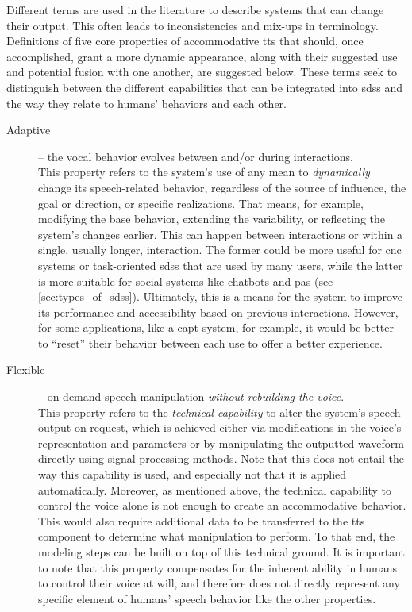 Different terms are used in the literature to describe systems that can change their output.
This often leads to inconsistencies and mix-ups in terminology.
Definitions of five core properties of accommodative \ac{tts} that should, once accomplished, grant a more dynamic appearance, along with their suggested use and potential fusion with one another, are suggested below.
These terms seek to distinguish between the different capabilities that can be integrated into \acp{sds} and the way they relate to humans’ behaviors and each other.
%
\begin{description}
	\item[Adaptive] -- the vocal behavior evolves between and/or during interactions.\\
	This property refers to the system's use of any mean to \emph{dynamically} change its speech-related behavior, regardless of the source of influence, the goal or direction, or specific realizations.
	That means, for example, modifying the base behavior, extending the variability, or reflecting the system's changes earlier.
	This can happen between interactions or within a single, usually longer, interaction.
	The former could be more useful for \ac{cnc} systems or task-oriented \acp{sds} that are used by many users, while the latter is more suitable for social systems like chatbots and \acp{pa} (see \cref{sec:types_of_sdss}).
	Ultimately, this is a means for the system to improve its performance and accessibility based on previous interactions.
	However, for some applications, like a \ac{capt} system, for example, it would be better to \enquote{reset} their behavior between each use to offer a better experience.

	\item[Flexible] -- on-demand speech manipulation \emph{without rebuilding the voice}.\\
	This property refers to the \emph{technical capability} to alter the system's speech output on request, which is achieved either via modifications in the voice's representation and parameters or by manipulating the outputted waveform directly using signal processing methods.
	Note that this does not entail the way this capability is used, and especially not that it is applied automatically.
	Moreover, as mentioned above, the technical capability to control the voice alone is not enough to create an accommodative behavior.
	This would also require additional data to be transferred to the \ac{tts} component to determine what manipulation to perform.
	To that end, the modeling steps can be built on top of this technical ground.
	It is important to note that this property compensates for the inherent ability in humans to control their voice at will, and therefore does not directly represent any specific element of humans' speech behavior like the other properties.
	

\end{description}
